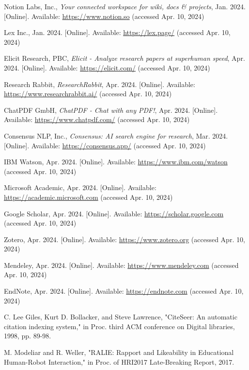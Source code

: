 \documentclass[a4paper,conference]{IEEEtran}
\begin{document}
\begin{thebibliography}{99}
Notion Labs, Inc., \emph{Your connected workspace for wiki, docs \& projects}, Jan. 2024. [Online]. Available: \url{https://www.notion.so} (accessed Apr. 10, 2024)

Lex Inc., Jan. 2024. [Online]. Available: \url{https://lex.page/} (accessed Apr. 10, 2024)

Elicit Research, PBC, \emph{Elicit - Analyze research papers at superhuman speed}, Apr. 2024. [Online]. Available: \url{https://elicit.com/} (accessed Apr. 10, 2024)

Research Rabbit, \emph{ResearchRabbit}, Apr. 2024. [Online]. Available: \url{https://www.researchrabbit.ai/} (accessed Apr. 10, 2024)

ChatPDF GmbH, \emph{ChatPDF - Chat with any PDF!}, Apr. 2024. [Online]. Available: \url{https://www.chatpdf.com/} (accessed Apr. 10, 2024)

Consensus NLP, Inc., \emph{Consensus: AI search engine for research}, Mar. 2024. [Online]. Available: \url{https://consensus.app/} (accessed Apr. 10, 2024)

IBM Watson, Apr. 2024. [Online]. Available: \url{https://www.ibm.com/watson} (accessed Apr. 10, 2024)

Microsoft Academic, Apr. 2024. [Online]. Available: \url{https://academic.microsoft.com} (accessed Apr. 10, 2024)

Google Scholar, Apr. 2024. [Online]. Available: \url{https://scholar.google.com} (accessed Apr. 10, 2024)

Zotero, Apr. 2024. [Online]. Available: \url{https://www.zotero.org} (accessed Apr. 10, 2024)

Mendeley, Apr. 2024. [Online]. Available: \url{https://www.mendeley.com} (accessed Apr. 10, 2024)

EndNote, Apr. 2024. [Online]. Available: \url{https://endnote.com} (accessed Apr. 10, 2024)

C. Lee Giles, Kurt D. Bollacker, and Steve Lawrence, "CiteSeer: An automatic citation indexing system," in Proc. third ACM conference on Digital libraries, 1998, pp. 89-98.

M. Modeliar and R. Weller, "RALIE: Rapport and Likeability in Educational Human-Robot Interaction," in Proc. of HRI2017 Late-Breaking Report, 2017.


\end{thebibliography}
\end{document}

